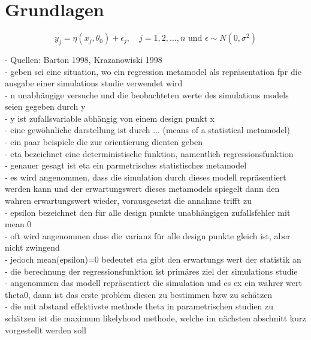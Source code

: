 \chapter{Grundlagen}
\label{chapter:kap2}
\begin{equation}
y_j = \eta(x_j, \theta_0) + \epsilon_j, 
\quad j=1,2,...,n \text{ und } \epsilon \sim N(0, \sigma^2)
\end{equation}

- Quellen: Barton 1998, Krazanowiski 1998\\
- geben sei eine situation, wo ein regression metamodel als repräsentation fpr die ausgabe einer simulations studie verwendet wird\\
- n unabhängige versuche und die beobachteten werte des simulations models seien gegeben durch y\\
- y ist zufallsvariable abhängig von einem design punkt x\\
- eine gewöhnliche darstellung ist durch ... (means of a statistical metamodel)\\
- ein paar beispiele die zur orientierung dienten geben\\
- eta bezeichnet eine deterministische funktion, namentlich regressionsfunktion\\
- genauer gesagt ist eta ein parmetrisches statistisches metamodel\\
- es wird angenommen, dass die simulation durch dieses modell repräsentiert werden kann und der erwartungswert dieses metamodels spiegelt dann den wahren erwartungswert wieder, vorausgesetzt die annahme trifft zu\\
- epsilon bezeichnet den für alle design punkte unabhängigen zufallsfehler mit mean 0\\
- oft wird angenommen dass die varianz für alle design punkte gleich ist, aber nicht zwingend\\
- jedoch mean(epsilon)=0 bedeutet eta gibt den erwartungs wert der statistik an\\
- die berechnung der regressionsfunktion ist primäres ziel der simulations studie\\
- angenommen das modell repräsentiert die simulation und es ex ein wahrer wert theta0, dann ist das erste problem diesen zu bestimmen bzw zu schätzen\\
- die mit abstand effektivste methode theta in parametrischen studien zu schätzen ist die maximum likelyhood methode, welche im nächsten abschnitt kurz vorgestellt werden soll\\

